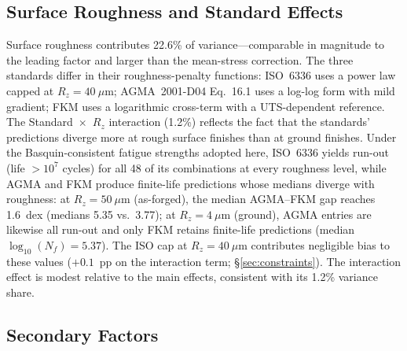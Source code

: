 \documentclass[twocolumn,12pt,a4paper]{article}
\begin{document}
\subsection{Surface Roughness and Standard Effects}

Surface roughness contributes 22.6\% of variance---comparable in
magnitude to the leading factor and larger than the mean-stress
correction. The three standards differ in their
roughness-penalty functions: ISO~6336 uses a power law capped at
$R_z=40~\mu$m; AGMA~2001-D04 Eq.~16.1 uses a log-log form with mild
gradient; FKM uses a logarithmic cross-term with a UTS-dependent
reference. The Standard~$\times$~$R_z$ interaction (1.2\%) reflects the
fact that the standards' predictions diverge more at rough surface
finishes than at ground finishes. Under the Basquin-consistent fatigue
strengths adopted here, ISO~6336 yields run-out (life $>10^7$ cycles)
for all 48 of its combinations at every roughness level, while AGMA
and FKM produce finite-life predictions whose medians diverge with
roughness: at $R_z=50~\mu$m (as-forged), the median AGMA--FKM gap
reaches 1.6~dex (medians 5.35 vs.\ 3.77); at $R_z=4~\mu$m (ground),
AGMA entries are likewise all run-out and only FKM retains finite-life
predictions (median $\log_{10}(N_f)=5.37$). The ISO cap at
$R_z=40~\mu$m contributes
negligible bias to these values ($+0.1$~pp on the interaction
term; \S\ref{sec:constraints}). The interaction effect is modest
relative to the main effects, consistent with its 1.2\% variance
share.

\subsection{Secondary Factors}
\end{document}
